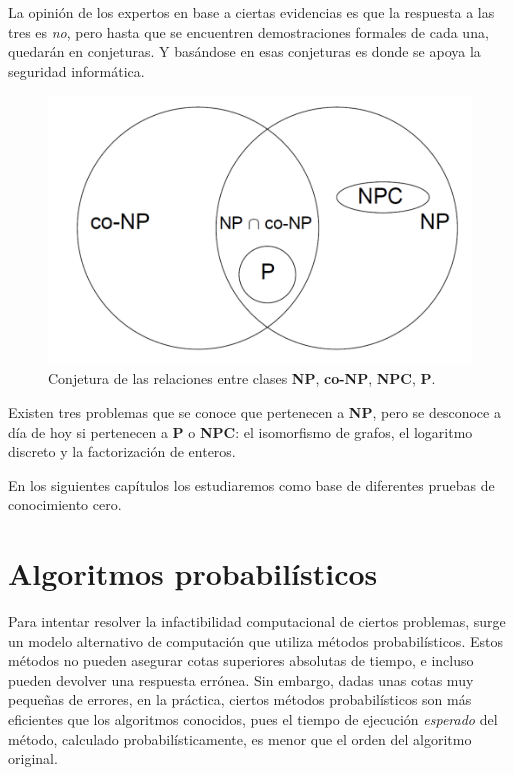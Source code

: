La opinión de los expertos en base a ciertas evidencias es que la respuesta a las tres es \textit{no}, pero hasta que se encuentren demostraciones formales de cada una, quedarán en conjeturas. Y basándose en esas conjeturas es donde se apoya la seguridad informática.


\begin{figure}[bth]
	\begin{center}
		\includegraphics[width=.45\linewidth]{gfx/NPclasses}
	\end{center}
	\caption{Conjetura de las relaciones entre clases \textbf{NP}, \textbf{co-NP}, \textbf{NPC}, \textbf{P}.}
	\label{fig:NPclasses}
\end{figure}


Existen tres problemas que se conoce que pertenecen a \textbf{NP}, pero se desconoce a día de hoy si pertenecen a \textbf{P} o \textbf{NPC}: el isomorfismo de grafos, el logaritmo discreto y la factorización de enteros.

En los siguientes capítulos los estudiaremos como base de diferentes pruebas de conocimiento cero.


\hfil


\section{Algoritmos probabilísticos} 

\hfil

Para intentar resolver la infactibilidad computacional de ciertos problemas, surge un modelo alternativo de computación que utiliza métodos probabilísticos. Estos métodos no pueden asegurar cotas superiores absolutas de tiempo, e incluso pueden devolver una respuesta errónea. Sin embargo, dadas unas cotas muy pequeñas de errores, en la práctica, ciertos métodos probabilísticos son más eficientes que los algoritmos conocidos, pues el tiempo de ejecución \textit{esperado} del método, calculado probabilísticamente, es menor que el orden del algoritmo original.



